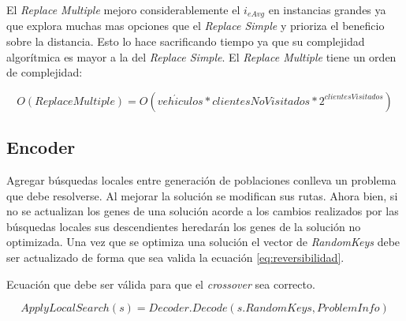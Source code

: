 \bigskip

El \textit{Replace Multiple} mejoro considerablemente el $i_{eAvg}$ en instancias grandes ya que explora muchas mas opciones que el \textit{Replace Simple} y prioriza el beneficio sobre la distancia. Esto lo hace sacrificando tiempo ya que su complejidad algorítmica es mayor a la del \textit{Replace Simple}. El \textit{Replace Multiple} tiene un orden de complejidad:

\begin{equation*}
O(Replace Multiple) = O(veh\acute{i}culos * clientesNoVisitados * 2^{clientesVisitados})
\end{equation*}


\subsection{Encoder}

Agregar búsquedas locales entre generación de poblaciones conlleva un problema que debe resolverse. Al mejorar la solución se modifican sus rutas. Ahora bien, si no se actualizan los genes de una solución acorde a los cambios realizados por las búsquedas locales sus descendientes heredarán los genes de la solución no optimizada. Una vez que se optimiza una solución el vector de \textit{RandomKeys} debe ser actualizado de forma que sea valida la ecuación \ref{eq:reversibilidad}.

\bigskip

\begin{mycapequ}[!ht]
	\caption{Ecuación que debe ser válida para que el \textit{crossover} sea correcto.}
	\begin{equation} \label{eq:reversibilidad}
	ApplyLocalSearch(s) = Decoder.Decode(s.RandomKeys, ProblemInfo)
	\end{equation}
\end{mycapequ}

\bigskip

